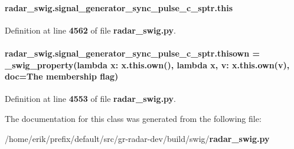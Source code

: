 \paragraph[{this}]{\setlength{\rightskip}{0pt plus 5cm}radar\+\_\+swig.\+signal\+\_\+generator\+\_\+sync\+\_\+pulse\+\_\+c\+\_\+sptr.\+this}\label{classradar__swig_1_1signal__generator__sync__pulse__c__sptr_a64d38257b01e7c24dee1f93cee17ae17}


Definition at line {\bf 4562} of file {\bf radar\+\_\+swig.\+py}.

\paragraph[{thisown}]{\setlength{\rightskip}{0pt plus 5cm}radar\+\_\+swig.\+signal\+\_\+generator\+\_\+sync\+\_\+pulse\+\_\+c\+\_\+sptr.\+thisown = {\bf \+\_\+swig\+\_\+property}(lambda x\+: x.\+this.\+own(), lambda {\bf x}, v\+: x.\+this.\+own(v), doc=\textquotesingle{}The membership flag\textquotesingle{})\hspace{0.3cm}{\ttfamily [static]}}\label{classradar__swig_1_1signal__generator__sync__pulse__c__sptr_acc90d8f9a539beb0a8a186b55f2b7375}


Definition at line {\bf 4553} of file {\bf radar\+\_\+swig.\+py}.



The documentation for this class was generated from the following file\+:\begin{DoxyCompactItemize}
\item 
/home/erik/prefix/default/src/gr-\/radar-\/dev/build/swig/{\bf radar\+\_\+swig.\+py}\end{DoxyCompactItemize}

